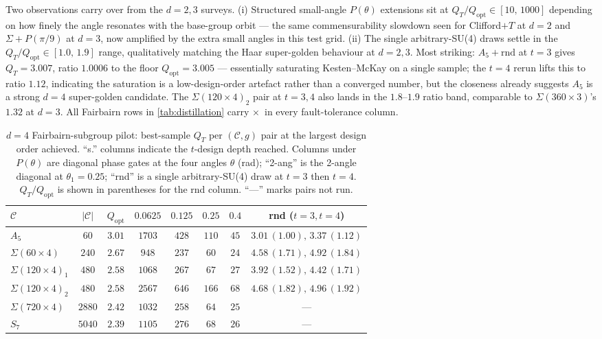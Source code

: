 \documentclass[twocolumn,superscriptaddress,showpacs,nofootinbib,notitlepage,preprintnumbers,secnumarabic,amssymb, nobibnotes, aps, prd]{revtex4-2}
\newcommand{\xmark}{\textcolor{BrickRed}{\ensuremath{\times}}}
\let\origtoprule\toprule
\let\origbottomrule\bottomrule
\renewcommand{\toprule}{\origtoprule\origtoprule}%
\renewcommand{\bottomrule}{\origbottomrule\origbottomrule}%
\newcommand{\QT}{Q_{T}}              %
\newcommand{\Popt}{Q_{\mathrm{opt}}} %
\newcommand{\Sigmathree}[1]{\Sigma(#1\!\times\!3)} %
\begin{document}
Two observations carry over from the $d=2,3$ surveys. (i) Structured small-angle $P(\theta)$ extensions sit at $\QT/\Popt \in [10,\,1000]$ depending on how finely the angle resonates with the base-group orbit --- the same commensurability slowdown seen for Clifford$+T$ at $d=2$ and $\Sigma+P(\pi/9)$ at $d=3$, now amplified by the extra small angles in this test grid. (ii) The single arbitrary-SU(4) draws settle in the $\QT/\Popt \in [1.0,\,1.9]$ range, qualitatively matching the Haar super-golden behaviour at $d=2,3$. Most striking: $A_5+\mathrm{rnd}$ at $t=3$ gives $\QT = 3.007$, ratio $1.0006$ to the floor $\Popt = 3.005$ --- essentially saturating Kesten--McKay on a single sample; the $t=4$ rerun lifts this to ratio $1.12$, indicating the saturation is a low-design-order artefact rather than a converged number, but the closeness already suggests $A_5$ is a strong $d=4$ super-golden candidate. The $\Sigma(120{\times}4)_2$ pair at $t=3,4$ also lands in the $1.8$--$1.9$ ratio band, comparable to $\Sigmathree{360}$'s $1.32$ at $d=3$. All Fairbairn rows in \cref{tab:distillation} carry \xmark\ in every fault-tolerance column.

\begin{table}[t]
\centering
\caption{\label{tab:d4_pilot}$d=4$ Fairbairn-subgroup pilot: best-sample $\QT$ per $(\mathcal{C},g)$ pair at the largest design order achieved. ``s.'' columns indicate the $t$-design depth reached. Columns under $P(\theta)$ are diagonal phase gates at the four angles $\theta$ (rad); ``2-ang'' is the 2-angle diagonal at $\theta_1=0.25$; ``rnd'' is a single arbitrary-SU(4) draw at $t=3$ then $t=4$. $\QT/\Popt$ is shown in parentheses for the rnd column. ``---'' marks pairs not run.}
\footnotesize
\setlength{\tabcolsep}{3pt}
\begin{tabular}{@{}lccccccc@{}}
\toprule
$\mathcal{C}$ & $|\mathcal{C}|$ & $\Popt$ & $0.0625$ & $0.125$ & $0.25$ & $0.4$ & rnd ($t{=}3,t{=}4$) \\
\midrule
$A_5$                    & $60$   & $3.01$ & $1703$ & $428$  & $110$ & $45$ & $3.01\,(1.00),\,3.37\,(1.12)$ \\
$\Sigma(60{\times}4)$    & $240$  & $2.67$ & $948$  & $237$  & $60$  & $24$ & $4.58\,(1.71),\,4.92\,(1.84)$ \\
$\Sigma(120{\times}4)_1$ & $480$  & $2.58$ & $1068$ & $267$  & $67$  & $27$ & $3.92\,(1.52),\,4.42\,(1.71)$ \\
$\Sigma(120{\times}4)_2$ & $480$  & $2.58$ & $2567$ & $646$  & $166$ & $68$ & $4.68\,(1.82),\,4.96\,(1.92)$ \\
$\Sigma(720{\times}4)$   & $2880$ & $2.42$ & $1032$ & $258$  & $64$  & $25$ & --- \\
$S_7$                    & $5040$ & $2.39$ & $1105$ & $276$  & $68$  & $26$ & --- \\
\bottomrule
\end{tabular}
\end{table}
\end{document}
